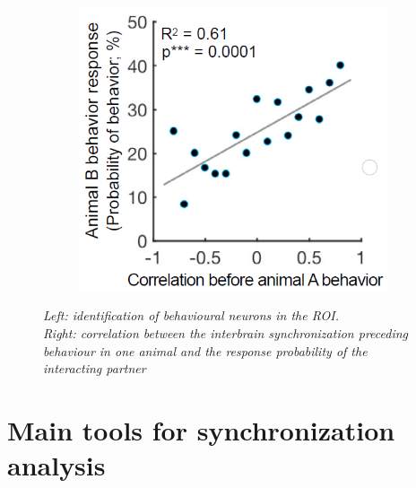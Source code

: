\documentclass[12pt, a4paper]{article}
\begin{document}
\begin{figure}[H]
\begin{minipage}{\linewidth}
\begin{minipage}{0.4\linewidth}
\begin{figure}[H]
			\end{figure}
		\end{minipage}
		\hspace{0.05\linewidth}
		\begin{minipage}{0.5\linewidth}
			\begin{figure}[H]
				\includegraphics[width=\linewidth]{kingsbury3.png}
				
			\end{figure}
		\end{minipage}
		
	\end{minipage}
	\caption{\textit{Left: identification of behavioural neurons in the ROI. \\
			Right: correlation between the interbrain synchronization preceding behaviour in one animal and the response probability of the interacting partner}}
\end{figure}

\newpage



\section{Main tools for synchronization analysis} 
\end{document}
